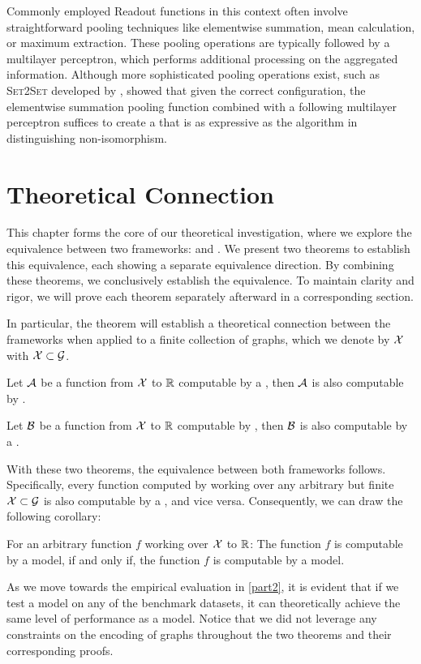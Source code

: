 Commonly employed \textsf{Readout} functions in this context often involve straightforward pooling techniques like elementwise summation, mean calculation, or maximum extraction. These pooling operations are typically followed by a multilayer perceptron, which performs additional processing on the aggregated information. Although more sophisticated pooling operations exist, such as \textsc{Set2Set} developed by \cite{Vinyals2015}, \cite{Xu2018} showed that given the correct configuration, the elementwise summation pooling function combined with a following multilayer perceptron suffices to create a \gnn that is as expressive as the \wl algorithm in distinguishing non-isomorphism.

\cleardoubleoddstandardpage
\chapter{Theoretical Connection}\label{sec:theo_connections}
This chapter forms the core of our theoretical investigation, where we explore the equivalence between two frameworks: \wlnn and \gnn. We present two theorems to establish this equivalence, each showing a separate equivalence direction. By combining these theorems, we conclusively establish the equivalence. To maintain clarity and rigor, we will prove each theorem separately afterward in a corresponding section.

In particular, the theorem will establish a theoretical connection between the frameworks when applied to a finite collection of graphs, which we denote by $\mathcal{X}$ with $\mathcal{X} \subset \mathcal{G}$.

\begin{theorem}\label{theorem:gnn_in_1wl}
    Let $\mathcal{A}$ be a function from $\mathcal{X}$ to $\mathbb{R}$ computable by a \gnn, then $\mathcal{A}$ is also computable by \wlnn.
\end{theorem}

\begin{theorem}\label{theorem:1wl_in_gnn}
    Let $\mathcal{B}$ be a function from $\mathcal{X}$ to $\mathbb{R}$ computable by \wlnn, then $\mathcal{B}$ is also computable by a \gnn.
\end{theorem}

With these two theorems, the equivalence between both frameworks follows. Specifically, every function computed by \wlnn working over any arbitrary but finite $\mathcal{X} \subset \mathcal{G}$ is also computable by a \gnn, and vice versa. Consequently, we can draw the following corollary:
\begin{corollary}
    For an arbitrary function $f$ working over $\mathcal{X}$ to $\mathbb{R}$: The function $f$ is computable by a \wlnn model, if and only if, the function $f$ is computable by a \gnn model.
\end{corollary}
As we move towards the empirical evaluation in \cref{part2}, it is evident that if we test a \wlnn model on any of the benchmark datasets, it can theoretically achieve the same level of performance as a \gnn model. Notice that we did not leverage any constraints on the encoding of graphs throughout the two theorems and their corresponding proofs.


